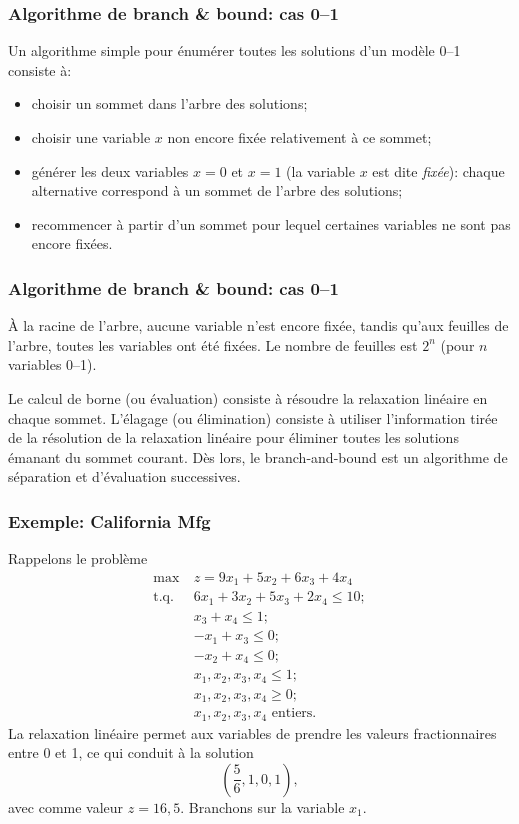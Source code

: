 \documentclass[usepdftitle=false]{beamer}
\def\st{\mbox{t.q. }}
\begin{document}
\begin{frame}
\frametitle{Algorithme de branch \& bound: cas 0--1}

Un algorithme simple pour énumérer toutes les solutions d'un modèle 0--1 consiste à:
\begin{itemize}
\item
choisir un sommet dans l'arbre des solutions;
\item
choisir une variable $x$ non encore fixée relativement à ce sommet;
\item
générer les deux variables $x = 0$ et $x = 1$ (la variable $x$ est dite {\sl fixée}): chaque alternative correspond à un sommet de l'arbre des solutions;
\item
recommencer à partir d'un sommet pour lequel certaines variables ne sont pas encore fixées.
\end{itemize}

\end{frame}

\begin{frame}
\frametitle{Algorithme de branch \& bound: cas 0--1}

À la racine de l'arbre, aucune variable n'est encore fixée, tandis qu'aux feuilles de l'arbre, toutes les variables ont été fixées.
Le nombre de feuilles est $2^n$ (pour $n$ variables 0--1).

\mbox{}

Le calcul de borne (ou évaluation) consiste à résoudre la relaxation linéaire en chaque sommet.
L'élagage (ou élimination) consiste à utiliser l'information tirée de la résolution de la relaxation linéaire pour éliminer toutes les solutions émanant du sommet courant.
Dès lors, le branch-and-bound est un algorithme de séparation et d'évaluation successives.

\end{frame}

\begin{frame}
\frametitle{Exemple: California Mfg}

Rappelons le problème
\begin{align*}
\max\ & z = 9x_1 + 5x_2 + 6x_3 + 4x_4 \\
\st & 6x_1 + 3x_2 + 5x_3 + 2x_4 \leq 10; \\
& x_3 + x_4 \leq 1; \\
& -x_1 + x_3 \leq 0; \\
& -x_2 + x_4 \leq 0; \\
& x_1, x_2, x_3, x_4 \leq 1; \\
& x_1, x_2, x_3, x_4 \geq 0; \\
& x_1, x_2, x_3, x_4 \mbox{ entiers}.
\end{align*}
La relaxation linéaire permet aux variables de prendre les valeurs fractionnaires entre 0 et 1, ce qui conduit à la solution
\[
\left( \frac{5}{6}, 1, 0, 1 \right),
\]
avec comme valeur $z = 16,5$.
Branchons sur la variable $x_1$.

\end{frame}
\end{document}
